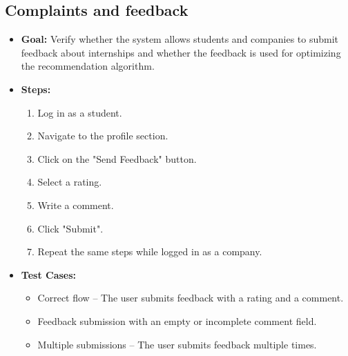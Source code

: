 \subsection{Complaints and feedback}
\begin{itemize}
    \item \textbf{Goal:} Verify whether the system allows students and companies to submit feedback about internships
        and whether the feedback is used for optimizing the recommendation algorithm.

    \item \textbf{Steps:}
    \begin{enumerate}
        \item Log in as a student.
        \item Navigate to the profile section.
        \item Click on the "Send Feedback" button.
        \item Select a rating.
        \item Write a comment.
        \item Click "Submit".
        \item Repeat the same steps while logged in as a company.
    \end{enumerate}

    \item \textbf{Test Cases:}
    \begin{itemize}
        \item Correct flow – The user submits feedback with a rating and a comment.
        \item Feedback submission with an empty or incomplete comment field.
        \item Multiple submissions – The user submits feedback multiple times.
    \end{itemize}


\end{itemize}

